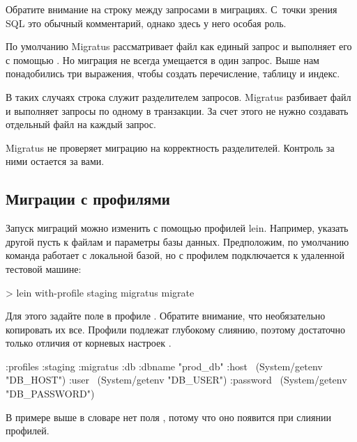 Обратите внимание на строку \code{--;;} между запросами в миграциях. С~точки зрения SQL это обычный комментарий, однако здесь у него особая роль.

По умолчанию Migratus рассматривает файл как единый запрос и выполняет его с помощью . Но миграция не всегда умещается в один запрос.
Выше нам понадобились три выражения, чтобы создать перечисление, таблицу и индекс.

В таких случаях строка \code{--;;} служит разделителем запросов. Migratus разбивает файл и выполняет запросы по одному в транзакции. За счет этого не нужно создавать отдельный файл на каждый запрос.

Migratus не проверяет миграцию на корректность разделителей. Контроль за ними остается за вами.

\subsection{Миграции с профилями}

Запуск миграций можно изменить с помощью профилей lein. Например, указать другой пусть к файлам и параметры базы данных. Предположим, по умолчанию команда  работает с локальной базой, но с профилем  подключается к удаленной тестовой машине:

\begin{english}
  \begin{bash}
> lein with-profile staging migratus migrate
  \end{bash}
\end{english}

Для этого задайте поле  в профиле . Обратите внимание, что необязательно копировать их все. Профили  подлежат глубокому слиянию, поэтому достаточно только отличия от корневых настроек .

\begin{english}
  \begin{clojure}
{:profiles
 {:staging
  {:migratus
   {:db {:dbname "prod_db"
         :host ~(System/getenv "DB_HOST")
         :user ~(System/getenv "DB_USER")
         :password ~(System/getenv "DB_PASSWORD")}}}}}
  \end{clojure}
\end{english}

В примере выше в словаре  нет поля , потому что оно появится при слиянии профилей.





